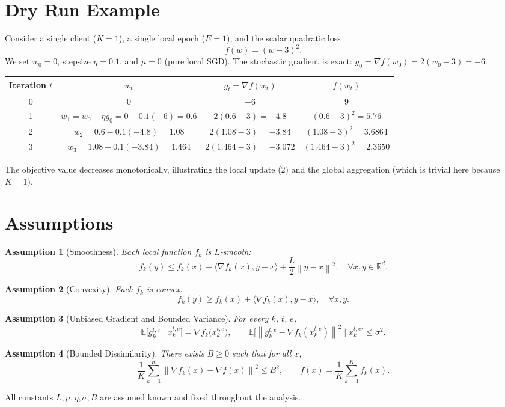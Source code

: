 \documentclass[11pt]{article}
\newtheorem{assumption}{Assumption}
\newcommand{\E}{\mathbb{E}}
\newcommand{\norm}[1]{\left\lVert #1\right\rVert}
\begin{document}
\section*{Dry Run Example}
Consider a single client ($K=1$), a single local epoch ($E=1$), and the scalar quadratic loss
\[
f(w)=(w-3)^{2}.
\]
We set $w_{0}=0$, stepsize $\eta=0.1$, and $\mu=0$ (pure local SGD).  
The stochastic gradient is exact: $g_{0}= \nabla f(w_{0})=2(w_{0}-3)=-6$.

\begin{center}
\begin{tabular}{c|c|c|c}
Iteration $t$ & $w_{t}$ & $g_{t}= \nabla f(w_{t})$ & $f(w_{t})$\\ \hline
0 & $0$ & $-6$ & $9$\\
1 & $w_{1}=w_{0}-\eta g_{0}=0-0.1(-6)=0.6$ & $2(0.6-3)=-4.8$ & $(0.6-3)^{2}=5.76$\\
2 & $w_{2}=0.6-0.1(-4.8)=1.08$ & $2(1.08-3)=-3.84$ & $(1.08-3)^{2}=3.6864$\\
3 & $w_{3}=1.08-0.1(-3.84)=1.464$ & $2(1.464-3)=-3.072$ & $(1.464-3)^{2}=2.3650$
\end{tabular}
\end{center}
The objective value decreases monotonically, illustrating the local update (2) and the global aggregation (which is trivial here because $K=1$).

\newpage
\section*{Assumptions}
\begin{assumption}[Smoothness]\label{as:smooth}
Each local function $f_k$ is $L$‑smooth:
\[
f_k(y)\le f_k(x)+\langle\nabla f_k(x),y-x\rangle+\frac{L}{2}\norm{y-x}^{2},
\quad\forall x,y\in\mathbb{R}^{d}.
\]
\end{assumption}
\begin{assumption}[Convexity]\label{as:convex}
Each $f_k$ is convex:
\[
f_k(y)\ge f_k(x)+\langle\nabla f_k(x),y-x\rangle,\quad\forall x,y.
\]
\end{assumption}
\begin{assumption}[Unbiased Gradient and Bounded Variance]\label{as:unbiased}
For every $k$, $t$, $e$,
\[
\E\!\big[g_{k}^{t,e}\mid x_{k}^{t,e}\big]=\nabla f_k\!\big(x_{k}^{t,e}\big),\qquad
\E\!\big[\norm{g_{k}^{t,e}-\nabla f_k(x_{k}^{t,e})}^{2}\mid x_{k}^{t,e}\big]\le\sigma^{2}.
\]
\end{assumption}
\begin{assumption}[Bounded Dissimilarity]\label{as:dissim}
There exists $B\ge0$ such that for all $x$,
\[
\frac{1}{K}\sum_{k=1}^{K}\norm{\nabla f_k(x)-\nabla f(x)}^{2}\le B^{2},
\qquad
f(x)=\frac{1}{K}\sum_{k=1}^{K}f_k(x).
\]
\end{assumption}
All constants $L,\mu,\eta,\sigma,B$ are assumed known and fixed throughout the analysis.
\end{document}
